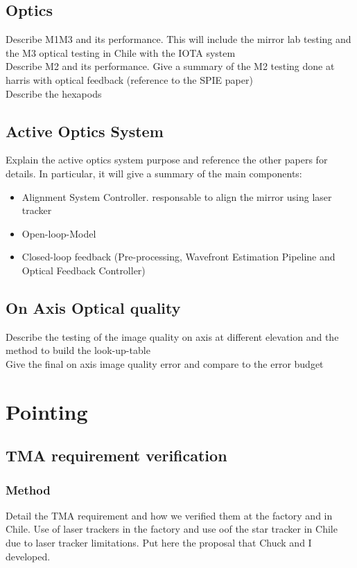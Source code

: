 \subsection{Optics}
Describe M1M3 and its performance. This will include the mirror lab testing and the M3 optical testing in Chile with the IOTA system \\
Describe M2 and its performance. Give a summary of the M2 testing done at harris  with optical feedback (reference to the SPIE paper)  \\
Describe the hexapods \\ 

\subsection{Active Optics System}
Explain the active optics system purpose and reference the other papers for details. In particular, it will give a summary of the main components:
\begin{itemize}
\item Alignment System Controller. responsable to align the mirror using laser tracker
\item Open-loop-Model
\item Closed-loop feedback (Pre-processing, Wavefront Estimation Pipeline and Optical Feedback Controller)
\end{itemize}

\subsection{On Axis Optical quality}
Describe the testing of the image quality on axis at different elevation and the method to build the look-up-table\\
Give the final on axis image quality error and compare to the error budget\\


\section{Pointing}
\subsection{TMA requirement verification}
\subsubsection{Method}
Detail the TMA requirement and how we verified them at the factory and in Chile. Use of laser trackers in the factory and use oof the star tracker in Chile due to laser tracker limitations. Put here the proposal that Chuck and I developed. 
